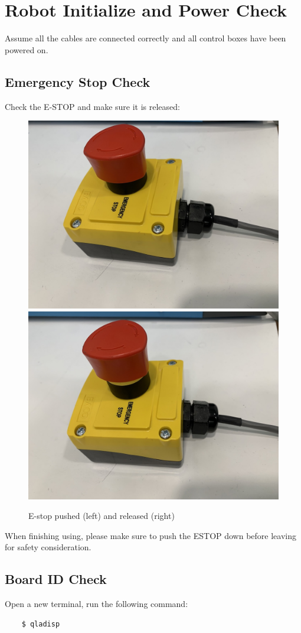 \section{Robot Initialize and Power Check}

Assume all the cables are connected correctly and all control boxes have been powered on.

\subsection{Emergency Stop Check}

Check the E-STOP and make sure it is released:

\begin{figure}[H]
    \centering
    \includegraphics[width=0.45\linewidth]{figures/ESTOP_push.jpeg}
    \includegraphics[width=0.45\linewidth]{figures/ESTOP_release.jpeg}
    \caption{E-stop pushed (left) and released (right)}
    \label{fig:ESTOP}
\end{figure}

When finishing using, please make sure to push the ESTOP down before leaving for safety consideration.

\subsection{Board ID Check}

Open a new terminal, run the following command:

\begin{verbatim}
    $ qladisp
\end{verbatim}

